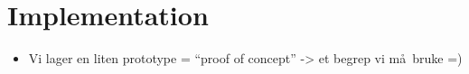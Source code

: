 \chapter{Implementation}
\label{chapter:implementation}

\begin{itemize}
  \item Vi lager en liten prototype = ``proof of concept'' -> et begrep vi m\aa~bruke =)
\end{itemize}





